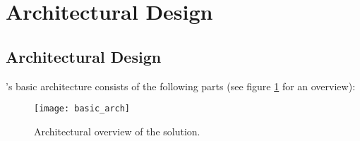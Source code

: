 
\iffalse
Since the \app solution is based on a modular design, this chapter starts with a description of the whole architecture.
Section \ref{sec:workflow} follows with an explanation of how \app is used in practice.
Section \ref{sec:comm} details the heart of the solution, NFC communication between Android and NFC terminal and cryptographic measures therein.
\fi

\section{Architectural Design}\label{sec:arch}

\subsection{Architectural Design}\label{sec:arch:det}


\app's basic architecture consists of the following parts (see figure \ref{fig:arch_ov} for an overview):

\begin{figure}
\centering
\texttt{[image: basic\_arch]}
\caption{Architectural overview of the \app solution.}
\label{fig:arch_ov}
\end{figure}



